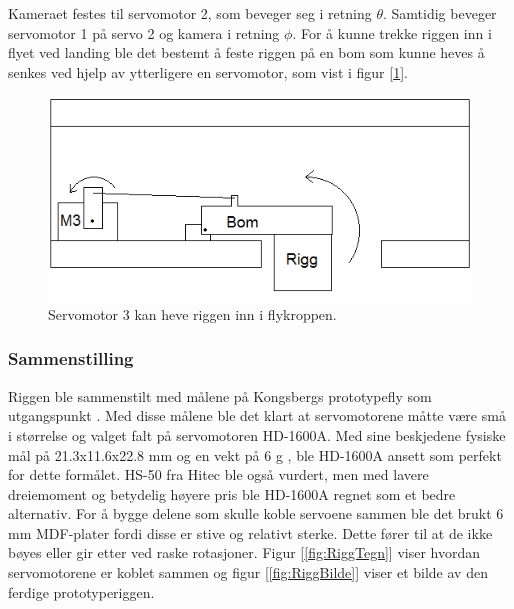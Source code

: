 Kameraet festes til servomotor 2, som beveger seg i retning $\theta$. Samtidig beveger servomotor 1 på servo 2 og kamera i retning $\phi$. For å kunne trekke riggen inn i flyet ved landing ble det bestemt å feste riggen på en bom som kunne heves å senkes ved hjelp av ytterligere en servomotor, som vist i figur [\ref{fig:bom}].

\begin{figure}[h!]
	\centering
	\includegraphics[scale=0.5]{img/Motor3.png}
	\caption{Servomotor 3 kan heve riggen inn i flykroppen.}
	\label{fig:bom}
\end{figure}

\subsubsection{Sammenstilling}

Riggen ble sammenstilt med målene på Kongsbergs prototypefly som utgangspunkt \cite{LocalHawkPDF}. Med disse målene ble det klart at servomotorene måtte være små i størrelse og valget falt på servomotoren HD-1600A. Med sine beskjedene fysiske mål på 21.3x11.6x22.8 mm og en vekt på $6$ g \cite{PowerHD}, ble HD-1600A ansett som perfekt for dette formålet. HS-50 fra Hitec ble også vurdert, men med lavere dreiemoment og betydelig høyere pris ble HD-1600A regnet som et bedre alternativ. For å bygge delene som skulle koble servoene sammen ble det brukt $6$ mm MDF-plater fordi disse er stive og relativt sterke. Dette fører til at de ikke bøyes eller gir etter ved raske rotasjoner. Figur [\ref{fig:RiggTegn}] viser hvordan servomotorene er koblet sammen og figur [\ref{fig:RiggBilde}] viser et bilde av den ferdige prototyperiggen. 

